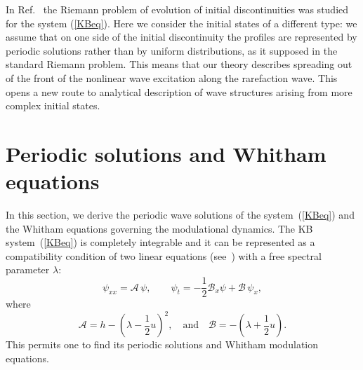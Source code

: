 \documentclass[pre,aps,superscriptaddress,twocolumn,floatfix]{revtex4-1}
\newcommand{\la}{\lambda}
\begin{document}
In Ref.~\cite{CongyIvanovKamchatnovPavloff-17} the Riemann problem
of evolution of initial discontinuities was studied for the system (\ref{KBeq}).
Here we consider the initial states of a different type: we assume that on one side of the
initial discontinuity the profiles are represented by periodic solutions rather than by
uniform distributions, as it supposed in the standard Riemann problem. This means that
our theory describes spreading out of the front of the nonlinear wave excitation along
the rarefaction wave. This opens a new route to analytical description of wave
structures arising from more complex initial states.


\section{Periodic solutions and Whitham equations}\label{sec.whitham}

In this section, we derive the periodic wave solutions of the system~(\ref{KBeq}) and
the Whitham equations governing the modulational dynamics. The KB system~(\ref{KBeq})
is completely integrable and it can be represented as a compatibility condition of
two linear equations (see~\cite{Kaup-75}) with a free spectral parameter $\la$:
\begin{equation}\label{eq5}
\psi _{xx}=\mathcal{A}\, \psi ,
\qquad
\psi _{t}=-\frac12\mathcal{B}_x\psi+\mathcal{B}\,\psi_x,
\end{equation}
where
\begin{equation}\label{eq6}
\mathcal{A}=h-\left(\la-\frac12 u\right)^2,\quad\mbox{and}\quad
\mathcal{B}=-\left(\la+\frac12 u\right).
\end{equation}
This permits one to find its periodic solutions and Whitham modulation equations.
\end{document}
